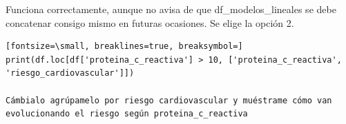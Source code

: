 \documentclass[12pt,a4paper,oneside]{book}
\begin{document}
\begin{iaanalisis}
Funciona correctamente, aunque no avisa de que df\_modelos\_lineales se debe concatenar consigo mismo en futuras ocasiones. Se elige la opción 2.
\end{iaanalisis}





\begin{iaprompt}
\begin{Verbatim}[fontsize=\small, breaklines=true, breaksymbol=]
print(df.loc[df['proteina_c_reactiva'] > 10, ['proteina_c_reactiva', 'riesgo_cardiovascular']])

Cámbialo agrúpamelo por riesgo cardiovascular y muéstrame cómo van evolucionando el riesgo según proteina_c_reactiva
\end{Verbatim}
\end{iaprompt}
\end{document}
